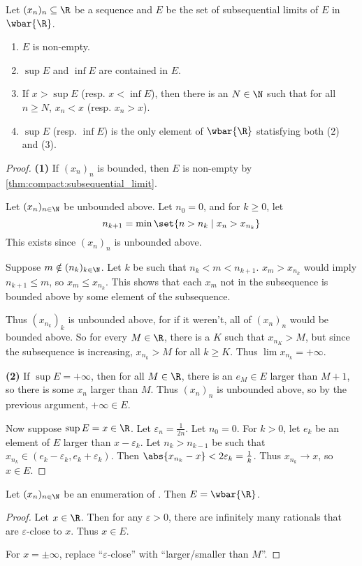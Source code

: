 \begin{theorem} \label{thm:sequences:R:limsup}
    Let $(x_n)_n \subseteq \R$ be a sequence and $E$ be the set of
    subsequential limits of $E$ in $\wbar{\R}$.
    \begin{enumerate}[label=(\arabic*)]
        \item $E$ is non-empty.
        \item $\sup E$ and $\inf E$ are contained in $E$.
        \item If $x > \sup E$ (resp. $x < \inf E$), then there is an
            $N \in \N$ such that for all $n \ge N$, $x_n < x$ (resp.
            $x_n > x$).
        \item $\sup E$ (resp. $\inf E$) is the only element of $\wbar{\R}$
            statisfying both (2) and (3).
    \end{enumerate}
\end{theorem}
\begin{proof}
    \textbf{(1)} If $(x_n)_n$ is bounded, then $E$ is
    non-empty by \cref{thm:compact:subsequential_limit}.

    Let $(x_n)_{n \in \N}$ be unbounded above.
    Let $n_0 = 0$, and for $k \ge 0$, let \[
        n_{k+1} = \min\set{n > n_k \mid x_n > x_{n_k}}
    \]
    This exists since $(x_n)_n$ is unbounded above.

    Suppose $m \notin (n_k)_{k \in \N}$.
    Let $k$ be such that $n_k < m < n_{k+1}$.
    $x_m > x_{n_k}$ would imply $n_{k+1} \le m$, so $x_m \le x_{n_k}$.
    This shows that each $x_m$ not in the subsequence is bounded above by
    some element of the subsequence.

    Thus ${(x_{n_k})}_k$ is unbounded above, for if it weren't, all of
    $(x_n)_n$ would be bounded above.
    So for every $M \in \R$, there is a $K$ such that $x_{n_K} > M$, but
    since the subsequence is increasing, $x_{n_k} > M$ for all $k \ge K$.
    Thus $\lim x_{n_k} = +\infty$.

    \textbf{(2)}
    If $\sup E = +\infty$, then for all $M \in \R$, there is an $e_M \in E$
    larger than $M + 1$, so there is some $x_n$ larger than $M$.
    Thus $(x_n)_n$ is unbounded above, so by the previous argument,
    $+\infty \in E$.

    Now suppose $\sup E = x \in \R$.
    Let $\varepsilon_n = \frac1{2n}$.
    Let $n_0 = 0$.
    For $k > 0$, let $e_k$ be an element of $E$ larger than
    $x - \varepsilon_k$.
    Let $n_k > n_{k-1}$ be such that $x_{n_k} \in (e_k - \varepsilon_k,
    e_k + \varepsilon_k)$.
    Then $\abs{x_{n_k} - x} < 2\varepsilon_k = \frac1k$.
    Thus $x_{n_k} \to x$, so $x \in E$.
\end{proof}
\begin{example}
    Let $(x_n)_{n \in \N}$ be an enumeration of \Q.
    Then $E = \wbar{\R}$.
    \begin{proof}
        Let $x \in \R$.
        Then for any $\varepsilon > 0$, there are infinitely many rationals
        that are $\varepsilon$-close to $x$.
        Thus $x \in E$.

        For $x = \pm\infty$, replace ``$\varepsilon$-close'' with
        ``larger/smaller than $M$''.
    \end{proof}
\end{example}

